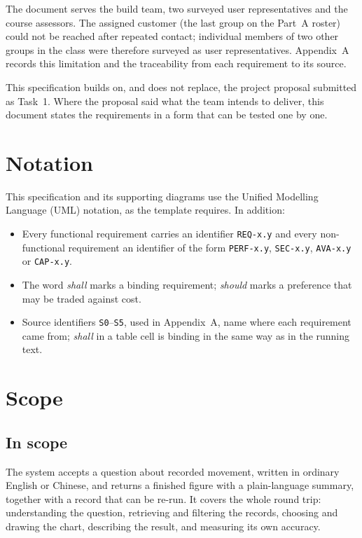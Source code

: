 \documentclass[12pt,a4paper]{report}
\begin{document}
The document serves the build team, two surveyed user representatives and
the course assessors. The assigned customer (the last group on the Part~A
roster) could not be reached after repeated contact; individual members of two
other groups in the class were therefore surveyed as user representatives.
Appendix~A records this limitation and the traceability from each requirement
to its source.

This specification builds on, and does not replace, the project proposal
submitted as Task~1. Where the proposal said what the team intends to
deliver, this document states the requirements in a form that can be
tested one by one.

\section{Notation}
\label{sec:notation}

This specification and its supporting diagrams use the Unified Modelling
Language (UML) notation, as the template requires. In addition:

\begin{itemize}
  \item Every functional requirement carries an identifier \texttt{REQ-x.y}
    and every non-functional requirement an identifier of the form
    \texttt{PERF-x.y}, \texttt{SEC-x.y}, \texttt{AVA-x.y} or
    \texttt{CAP-x.y}.
  \item The word \emph{shall} marks a binding requirement; \emph{should}
    marks a preference that may be traded against cost.
  \item Source identifiers \texttt{S0}--\texttt{S5}, used in Appendix~A,
    name where each requirement came from; \emph{shall} in a table cell is
    binding in the same way as in the running text.
\end{itemize}

\section{Scope}
\label{sec:scope}

\subsection{In scope}
The system accepts a question about recorded movement, written in ordinary
English or Chinese, and returns a finished figure with a plain-language
summary, together with a record that can be re-run. It covers the whole
round trip: understanding the question, retrieving and filtering the
records, choosing and drawing the chart, describing the result, and
measuring its own accuracy.
\end{document}

